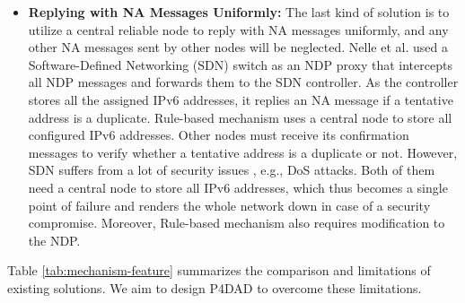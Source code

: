 \documentclass[journal]{IEEEtran}
\begin{document}
\begin{itemize}
        \item\textbf{Replying with NA Messages Uniformly:}
            The last kind of solution is to utilize a central reliable node to reply with NA messages uniformly, and any other NA messages sent by other nodes will be neglected. Nelle et al. \cite{ndp-proxy} used a Software-Defined Networking (SDN) switch as an NDP proxy that intercepts all NDP messages and forwards them to the SDN controller. As the controller stores all the assigned IPv6 addresses, it replies an NA message if a tentative address is a duplicate. Rule-based mechanism \cite{Controller-Scheme} uses a central node to store all configured IPv6 addresses. Other nodes must receive its confirmation messages to verify whether a tentative address is a duplicate or not. However, SDN suffers from a lot of security issues \cite{DBLP:conf/sdn4fns/Scott-HaywardOS13,DBLP:journals/comsur/Scott-HaywardNS16,DBLP:journals/comsur/AhmadNYG15}, e.g., DoS attacks. Both of them need a central node to store all IPv6 addresses, which thus becomes a single point of failure and renders the whole network down in case of a security compromise. Moreover, Rule-based mechanism also requires modification to the NDP.
        \end{itemize}

        Table \ref{tab:mechanism-feature} summarizes the comparison and limitations of existing solutions. We aim to design P4DAD to overcome these limitations.
            
\end{document}
